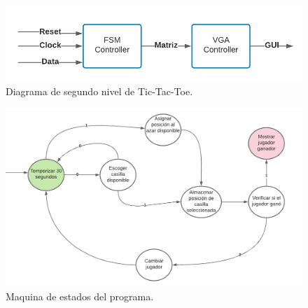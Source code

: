\documentclass[journal,trans]{IEEEtran}
\begin{document}
	
	\begin{figure}[hbtp]
		\centering
		\includegraphics[width = \columnwidth]{imagenes/SegundoN.png}
		\caption[Figura1]{Diagrama de segundo nivel de Tic-Tac-Toe.}
		\label{fig:SegundoN}
	\end{figure}
	
	
	\begin{figure}[hbtp]
		\centering
		\includegraphics[width = \columnwidth]{imagenes/MaqEst.png}
		\caption[Figura1]{Maquina de estados del programa.}
		\label{fig:MaqEst}
	\end{figure}
	
\end{document}
